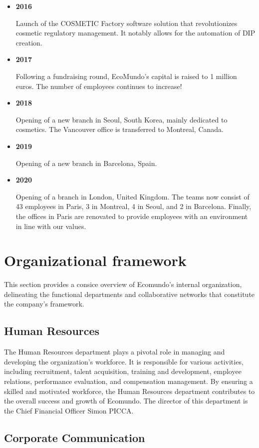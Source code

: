\documentclass[a4paper,12pt,twoside]{report}
\begin{document}
\begin{itemize}
\item \textbf{2016}

Launch of the COSMETIC Factory software solution that revolutionizes cosmetic regulatory management. It notably allows for the automation of DIP creation.

\item \textbf{2017}

Following a fundraising round, EcoMundo's capital is raised to 1 million euros. The number of employees continues to increase!

\item \textbf{2018}

Opening of a new branch in Seoul, South Korea, mainly dedicated to cosmetics. The Vancouver office is transferred to Montreal, Canada.

\item \textbf{2019}

Opening of a new branch in Barcelona, Spain.

\item \textbf{2020}

Opening of a branch in London, United Kingdom. The teams now consist of 43 employees in Paris, 3 in Montreal, 4 in Seoul, and 2 in Barcelona. Finally, the offices in Paris are renovated to provide employees with an environment in line with our values.
\end{itemize}
\section{Organizational framework}
This section provides a consice overview of Ecomundo's internal organization, delineating the functional departments and collaborative networks that constitute the company's framework.
\subsection{Human Resources}

The Human Resources department plays a pivotal role in managing and developing the organization's workforce. It is responsible for various activities, including recruitment, talent acquisition, training and development, employee relations, performance evaluation, and compensation management. By ensuring a skilled and motivated workforce, the Human Resources department contributes to the overall success and growth of Ecomundo. The director of this department is the Chief Financial Officer Simon PICCA.

\subsection{Corporate Communication}
\end{document}
